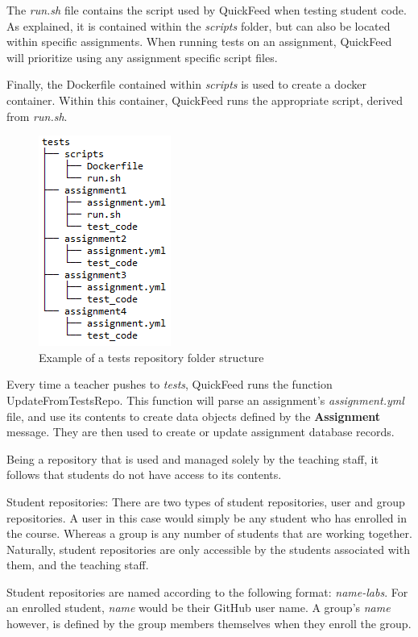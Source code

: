 The \textit{run.sh} file contains the script used by QuickFeed when testing student code.
As explained, it is contained within the \textit{scripts} folder, but can also be located within specific assignments.
When running tests on an assignment, QuickFeed will prioritize using any assignment specific script files.

Finally, the Dockerfile contained within \textit{scripts} is used to create a docker container.
Within this container, QuickFeed runs the appropriate script, derived from \textit{run.sh}.

\begin{figure}[ht]
    \centering
    \includegraphics[scale=0.8]{photos/tests-repository-structure.PNG}
    \caption{Example of a tests repository folder structure}
    \label{fig:tests-repository-structure}
\end{figure}

Every time a teacher pushes to \textit{tests}, QuickFeed runs the function UpdateFromTestsRepo.
This function will parse an assignment's \textit{assignment.yml} file, and use its contents to create data objects defined by the \textbf{Assignment} message.
They are then used to create or update assignment database records.

Being a repository that is used and managed solely by the teaching staff, it follows that students do not have access to its contents.

Student repositories: There are two types of student repositories, user and group repositories.
A user in this case would simply be any student who has enrolled in the course.
Whereas a group is any number of students that are working together.
Naturally, student repositories are only accessible by the students associated with them, and the teaching staff.

Student repositories are named according to the following format: \textit{name-labs}.
For an enrolled student, \textit{name} would be their GitHub user name.
A group's \textit{name} however, is defined by the group members themselves when they enroll the group.

